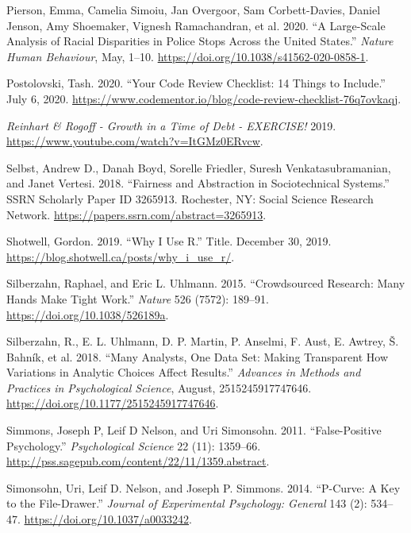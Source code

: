 \documentclass[
]{article}
\newlength{\cslhangindent}
\newenvironment{cslreferences}%
  {\setlength{\parindent}{0pt}%
  \everypar{\setlength{\hangindent}{\cslhangindent}}\ignorespaces}%
  {\par}
\begin{document}
\begin{cslreferences}
\leavevmode\hypertarget{ref-PiersonLargescaleAnalysisRacial2020}{}%
Pierson, Emma, Camelia Simoiu, Jan Overgoor, Sam Corbett-Davies, Daniel Jenson, Amy Shoemaker, Vignesh Ramachandran, et al. 2020. ``A Large-Scale Analysis of Racial Disparities in Police Stops Across the United States.'' \emph{Nature Human Behaviour}, May, 1--10. \url{https://doi.org/10.1038/s41562-020-0858-1}.

\leavevmode\hypertarget{ref-PostolovskiYourCodeReview2020}{}%
Postolovski, Tash. 2020. ``Your Code Review Checklist: 14 Things to Include.'' July 6, 2020. \url{https://www.codementor.io/blog/code-review-checklist-76q7ovkaqj}.

\leavevmode\hypertarget{ref-ReinhartRogoffGrowth2019}{}%
\emph{Reinhart \& Rogoff - Growth in a Time of Debt - EXERCISE!} 2019. \url{https://www.youtube.com/watch?v=ItGMz0ERvcw}.

\leavevmode\hypertarget{ref-SelbstFairnessAbstractionSociotechnical2018}{}%
Selbst, Andrew D., Danah Boyd, Sorelle Friedler, Suresh Venkatasubramanian, and Janet Vertesi. 2018. ``Fairness and Abstraction in Sociotechnical Systems.'' SSRN Scholarly Paper ID 3265913. Rochester, NY: Social Science Research Network. \url{https://papers.ssrn.com/abstract=3265913}.

\leavevmode\hypertarget{ref-ShotwellWhyUse2019}{}%
Shotwell, Gordon. 2019. ``Why I Use R.'' Title. December 30, 2019. \url{https://blog.shotwell.ca/posts/why_i_use_r/}.

\leavevmode\hypertarget{ref-SilberzahnCrowdsourcedResearchMany2015}{}%
Silberzahn, Raphael, and Eric L. Uhlmann. 2015. ``Crowdsourced Research: Many Hands Make Tight Work.'' \emph{Nature} 526 (7572): 189--91. \url{https://doi.org/10.1038/526189a}.

\leavevmode\hypertarget{ref-SilberzahnManyAnalystsOne2018}{}%
Silberzahn, R., E. L. Uhlmann, D. P. Martin, P. Anselmi, F. Aust, E. Awtrey, Š. Bahník, et al. 2018. ``Many Analysts, One Data Set: Making Transparent How Variations in Analytic Choices Affect Results.'' \emph{Advances in Methods and Practices in Psychological Science}, August, 2515245917747646. \url{https://doi.org/10.1177/2515245917747646}.

\leavevmode\hypertarget{ref-SimmonsFalsePositivePsychology2011}{}%
Simmons, Joseph P, Leif D Nelson, and Uri Simonsohn. 2011. ``False-Positive Psychology.'' \emph{Psychological Science} 22 (11): 1359--66. \url{http://pss.sagepub.com/content/22/11/1359.abstract}.

\leavevmode\hypertarget{ref-SimonsohnPcurveKeyFiledrawer2014}{}%
Simonsohn, Uri, Leif D. Nelson, and Joseph P. Simmons. 2014. ``P-Curve: A Key to the File-Drawer.'' \emph{Journal of Experimental Psychology: General} 143 (2): 534--47. \url{https://doi.org/10.1037/a0033242}.


\end{cslreferences}
\end{document}
